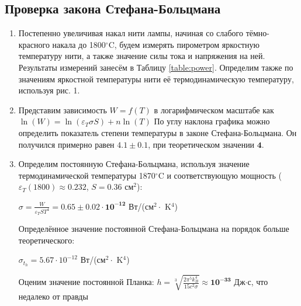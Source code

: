 \documentclass[a4paper, 12pt]{article}
\begin{document}
\subsection*{Проверка закона Стефана-Больцмана}
\begin{enumerate}
    \item Постепенно увеличивая накал нити лампы, начиная со слабого тёмно-красного накала до 1800$^{\circ}$C, будем измерять пирометром яркостную температуру нити, а также значение силы тока и напряжения на ней. Результаты измерений занесём в Таблицу \ref{table:power}. Определим также по значениям яркостной температуры нити её термодинамическую температуру, используя рис. 1.
    

\item Представим зависимость $W=f(T)$ в логарифмическом масштабе как $\ln(W) = \ln(\varepsilon_T \sigma S) + n \ln(T)$ По углу наклона графика можно определить показатель степени температуры в законе Стефана-Больцмана. Он получился примерно равен $\pmb{4.1\pm0.1}$, при теоретическом значении $\pmb{4}$. 



\item Определим постоянную Стефана-Больцмана, используя значение термодинамической температуры 1870$^{\circ}$C и соответствующую мощность ($\varepsilon_T(1800) \approx 0.232$, $S = 0.36$ см$^2$):
\begin{center}
    $\sigma = \frac{W}{\varepsilon_T S T^4} = \pmb{0.65\pm0.02 \cdot 10^{\pmb{-12}}}$ Вт/(см$^2 \cdot$ K$^4$)
\end{center}

Определённое значение постоянной Стефана-Больцмана на порядок больше теоретического:
\begin{center}
    $\sigma_t_h = 5.67\cdot 10^{-12}$ Вт/(см$^2 \cdot$ K$^4$)
\end{center}

\begin{minipage}{0.6\textwidth}
\end{minipage}
\begin{minipage}{0.4\textwidth}
Оценим значение постоянной Планка:
    $h = \sqrt[3]{\frac{2 \pi^5 k_B^4}{15 c^2 \sigma}} \approx \pmb{10}^{\pmb{-33}}$ Дж$\cdot$с, что недалеко от правды


\end{minipage}
\end{enumerate}
\end{document}
